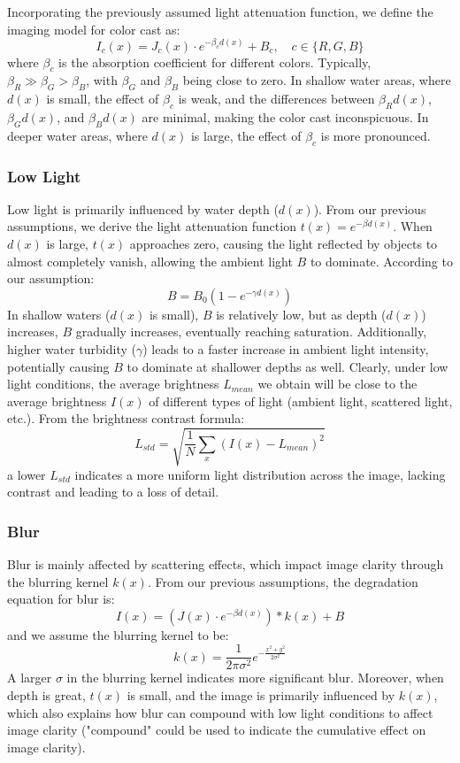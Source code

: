 \documentclass[11pt]{article}
\begin{document}
    Incorporating the previously assumed light attenuation function, we define the imaging model for color cast as:
    \[ I_c(x) = J_c(x) \cdot e^{-\beta_c d(x)} + B_c, \quad c \in \{R, G, B\} \]
    where \( \beta_c \) is the absorption coefficient for different colors. Typically, \( \beta_R \gg \beta_G > \beta_B \), with \( \beta_G \) and \( \beta_B \) being close to zero.
    In shallow water areas, where \( d(x) \) is small, the effect of \( \beta_c \) is weak, and the differences between \( \beta_R d(x) \), \( \beta_G d(x) \), and \( \beta_B d(x) \) are minimal, making the color cast inconspicuous.
    In deeper water areas, where \( d(x) \) is large, the effect of \( \beta_c \) is more pronounced.

    \subsubsection{Low Light}
    Low light is primarily influenced by water depth (\( d(x) \)).
    From our previous assumptions, we derive the light attenuation function \( t(x) = e^{-\beta d(x)} \). When \( d(x) \) is large, \( t(x) \) approaches zero, causing the light reflected by objects to almost completely vanish,
    allowing the ambient light \( B \) to dominate. According to our assumption:
    \[ B = B_0(1 - e^{-\gamma d(x)}) \]
    In shallow waters (\( d(x) \) is small), \( B \) is relatively low, but as depth (\( d(x) \)) increases,
    \( B \) gradually increases, eventually reaching saturation. Additionally, higher water turbidity (\( \gamma \)) leads to a faster increase in ambient light intensity, potentially causing \( B \) to dominate at shallower depths as well.
    Clearly, under low light conditions, the average brightness \( L_{mean} \) we obtain will be close to the average brightness \( I(x) \) of different types of light (ambient light, scattered light, etc.). From the brightness contrast formula:
    \[ L_{std} = \sqrt{\frac{1}{N} \sum_{x} (I(x) - L_{mean})^2} \]
    a lower \( L_{std} \) indicates a more uniform light distribution across the image, lacking contrast and leading to a loss of detail.

    \subsubsection{Blur}
    Blur is mainly affected by scattering effects, which impact image clarity through the blurring kernel \( k(x) \).
    From our previous assumptions, the degradation equation for blur is:
    \[ I(x) = (J(x) \cdot e^{-\beta d(x)}) * k(x) + B \]
    and we assume the blurring kernel to be:
    \[ k(x) = \frac{1}{2\pi\sigma^2} e^{-\frac{x^2 + y^2}{2\sigma^2}} \]
    A larger \( \sigma \) in the blurring kernel indicates more significant blur.
    Moreover, when depth is great, \( t(x) \) is small, and the image is primarily influenced by \( k(x) \), which also explains how blur can compound with low light conditions to affect image clarity ("compound" could be used to indicate the cumulative effect on image clarity).
\end{document}
